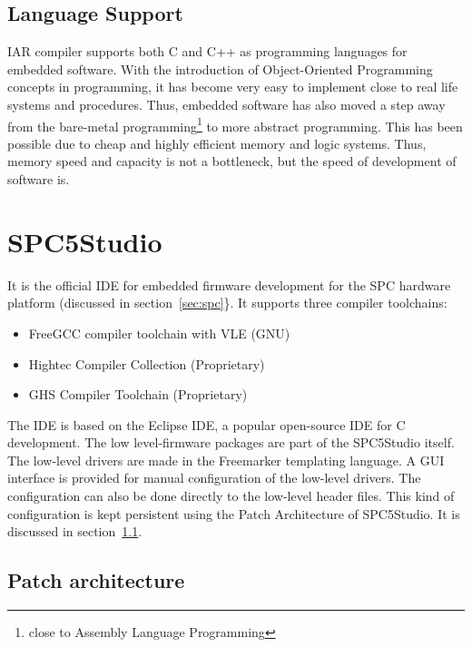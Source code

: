 \documentclass[]{book}
\providecommand{\tightlist}{%
  \setlength{\itemsep}{0pt}\setlength{\parskip}{0pt}}
\begin{document}
\subsection{Language Support}\label{language-support}

IAR compiler supports both C and C++ as programming languages for
embedded software. With the introduction of Object-Oriented Programming
concepts in programming, it has become very easy to implement close to
real life systems and procedures. Thus, embedded software has also moved
a step away from the bare-metal programming\footnote{close to Assembly
  Language Programming} to more abstract programming. This has been
possible due to cheap and highly efficient memory and logic systems.
Thus, memory speed and capacity is not a bottleneck, but the speed of
development of software is.

\section{SPC5Studio}\label{spc5studio}

It is the official IDE for embedded firmware development for the SPC
hardware platform (discussed in section~\ref{sec:spc}\}. It supports
three compiler toolchains:

\begin{itemize}
\tightlist
\item
  FreeGCC compiler toolchain with VLE (GNU)
\item
  Hightec Compiler Collection (Proprietary)
\item
  GHS Compiler Toolchain (Proprietary)
\end{itemize}

The IDE is based on the Eclipse IDE, a popular open-source IDE for C
development. The low level-firmware packages are part of the SPC5Studio
itself. The low-level drivers are made in the Freemarker templating
language. A GUI interface is provided for manual configuration of the
low-level drivers. The configuration can also be done directly to the
low-level header files. This kind of configuration is kept persistent
using the Patch Architecture of SPC5Studio. It is discussed in
section~\ref{sec:spcstudio_patches}.

\subsection{Patch architecture}\label{sec:spcstudio_patches}
\end{document}
